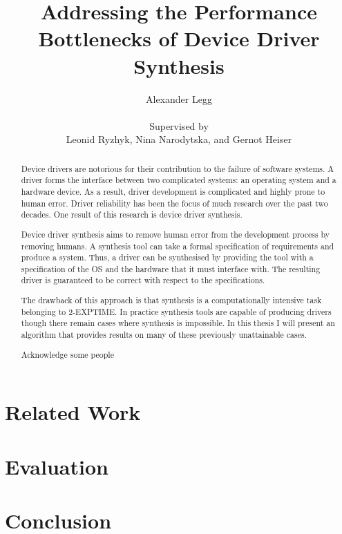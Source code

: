 \documentclass[a4paper, twoside, openright, 11pt, oldfontcommands]{memoir}
\title{Addressing the Performance Bottlenecks of Device Driver Synthesis}
\author{Alexander Legg \\
    \\
    Supervised by \\
Leonid Ryzhyk, Nina Narodytska, and Gernot Heiser}
\begin{document}
\maketitle

\setcounter{secnumdepth}{3}
\setcounter{tocdepth}{3}
\tableofcontents

\begin{abstract}

Device drivers are notorious for their contribution to the failure of software
systems. A driver forms the interface between two complicated systems: an
operating system and a hardware device. As a result, driver development is
complicated and highly prone to human error. Driver reliability has been the
focus of much research over the past two decades. One result of this research
is device driver synthesis.

Device driver synthesis aims to remove human error from the development process
by removing humans. A synthesis tool can take a formal specification of
requirements and produce a system. Thus, a driver can be synthesised by
providing the tool with a specification of the OS and the hardware that it must
interface with. The resulting driver is guaranteed to be correct with respect
to the specifications.

The drawback of this approach is that synthesis is a computationally intensive
task belonging to 2-EXPTIME. In practice synthesis tools are capable of
producing drivers though there remain cases where synthesis is impossible. In
this thesis I will present an algorithm that provides results on many of these
previously unattainable cases.

\end{abstract}

\renewcommand{\abstractname}{Acknowledgements}
\begin{abstract}
Acknowledge some people
\end{abstract}





\chapter{Related Work}
\label{ch:relatedwork}





\chapter{Evaluation}

\chapter{Conclusion}



\end{document}
